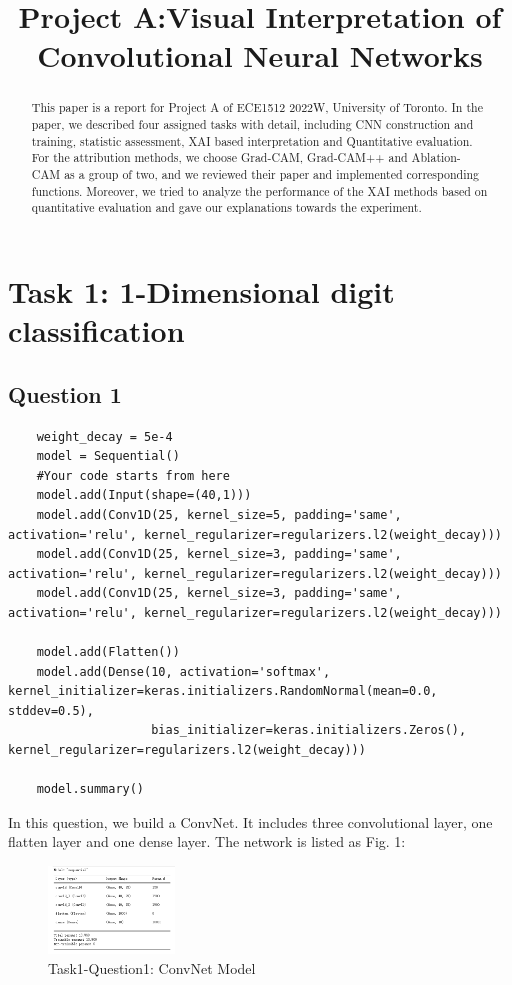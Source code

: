 \documentclass[conference]{IEEEtran}
\begin{document}
\title{Project A:Visual Interpretation of Convolutional Neural Networks}

\begin{abstract}
This paper is a report for Project A of ECE1512 2022W, University of Toronto. In the paper, we described four assigned tasks with detail, including CNN construction and training, statistic assessment, XAI based interpretation and Quantitative evaluation. For the attribution methods, we choose Grad-CAM, Grad-CAM++ and Ablation-CAM as a group of two, and we reviewed their paper and implemented corresponding functions. Moreover, we tried to analyze the performance of the XAI methods based on quantitative evaluation and gave our explanations towards the experiment.
\end{abstract}

\section{Task 1: 1-Dimensional digit classification}
\subsection{Question 1}
\begin{lstlisting}
    weight_decay = 5e-4
    model = Sequential()
    #Your code starts from here 
    model.add(Input(shape=(40,1)))
    model.add(Conv1D(25, kernel_size=5, padding='same', activation='relu', kernel_regularizer=regularizers.l2(weight_decay)))
    model.add(Conv1D(25, kernel_size=3, padding='same', activation='relu', kernel_regularizer=regularizers.l2(weight_decay)))
    model.add(Conv1D(25, kernel_size=3, padding='same', activation='relu', kernel_regularizer=regularizers.l2(weight_decay)))

    model.add(Flatten())
    model.add(Dense(10, activation='softmax', kernel_initializer=keras.initializers.RandomNormal(mean=0.0, stddev=0.5),
                    bias_initializer=keras.initializers.Zeros(), kernel_regularizer=regularizers.l2(weight_decay)))

    model.summary()
\end{lstlisting}
In this question, we build a ConvNet. It includes three convolutional layer, one flatten layer and one dense layer.
The network is listed as Fig. 1:
\begin{figure}[h] 
    \centering %
    \includegraphics[width=0.3\textwidth]{T1Q1.png} %
    \caption{Task1-Question1: ConvNet Model} %
    \label{Fig.t1q1} %
\end{figure}
\end{document}
